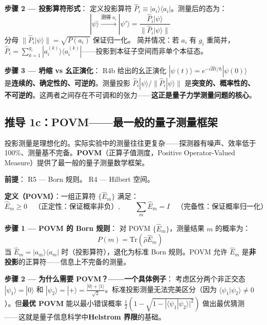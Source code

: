 \textbf{步骤 2 — 投影算符形式}：\fbox{[S]} 定义投影算符 $\hat{P}_i \equiv |a_i\rangle\langle a_i|$。测量后的态为：
\begin{equation}
\boxed{|\psi\rangle \xrightarrow{\text{测得 }a_i} |\psi'\rangle = \frac{\hat{P}_i|\psi\rangle}{\|\hat{P}_i|\psi\rangle\|}}
\end{equation}
\fbox{[S]} 分母 $\|\hat{P}_i|\psi\rangle\| = \sqrt{P(a_i)}$ 保证归一化。\fbox{[N]} 简并情况：若 $a_i$ 有 $g_i$ 重简并，$\hat{P}_i = \sum_{k=1}^{g_i} |a_i^{(k)}\rangle\langle a_i^{(k)}|$——投影到本征子空间而非单个本征态。

\textbf{步骤 3 — 坍缩 vs 幺正演化}：\fbox{[S]} R4b 给出的幺正演化 $|\psi(t)\rangle = e^{-i\hat{H}t/\hbar}|\psi(0)\rangle$ 是\textbf{连续的、确定性的、可逆的}。测量投影 $\hat{P}_i|\psi\rangle/\|\hat{P}_i|\psi\rangle\|$ 是\textbf{突变的、概率性的、不可逆的}。这两者之间存在不可调和的张力——\textbf{这正是量子力学测量问题的核心}。


\subsection{推导 1c：POVM——最一般的量子测量框架}

投影测量是理想化的。实际实验中的测量往往更复杂——探测器有噪声、效率低于 100\%、测量基不完备。\textbf{POVM}（正算子值测度，Positive Operator-Valued Measure）提供了最一般的量子测量数学框架。

\textbf{前提}：\fbox{[N]} R5 — Born 规则。\fbox{[N]} R4 — Hilbert 空间。

\textbf{定义（POVM）}：一组正算符 $\{\hat{E}_m\}$ 满足：
\begin{equation}
\hat{E}_m \ge 0 \quad \text{（正定性：保证概率非负）}, \qquad \sum_m \hat{E}_m = I \quad \text{（完备性：保证概率归一化）}
\end{equation}

\textbf{步骤 1 — POVM 的 Born 规则}：\fbox{[S]} 对 POVM $\{\hat{E}_m\}$，测量结果 $m$ 的概率为：
\begin{equation}
\boxed{P(m) = \text{Tr}(\hat{\rho}\hat{E}_m)}
\end{equation}
\fbox{[S]} 当 $\hat{E}_m = |a_m\rangle\langle a_m|$ 时（投影算符），退化为标准 Born 规则。POVM 允许 $\hat{E}_m$ 是\textbf{非投影}的正算符——信息上不完备的测量。

\textbf{步骤 2 — 为什么需要 POVM？——一个具体例子}：\fbox{[S]} 考虑区分两个非正交态 $|\psi_1\rangle = |0\rangle$ 和 $|\psi_2\rangle = |+\rangle = \frac{|0\rangle+|1\rangle}{\sqrt{2}}$。标准投影测量无法完美区分（因为 $\langle\psi_1|\psi_2\rangle \neq 0$）。但\textbf{最优 POVM} 能以最小错误概率 $\frac{1}{2}(1-\sqrt{1-|\langle\psi_1|\psi_2\rangle|^2})$ 做出最优猜测——这就是量子信息科学中\textbf{Helstrom 界限}的基础。

